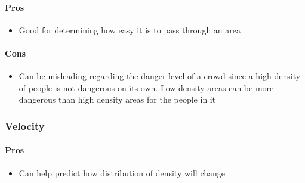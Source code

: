 \paragraph{Pros}
\begin{itemize}
    \item Good for determining how easy it is to pass through an area
\end{itemize}

\paragraph{Cons}
\begin{itemize}
    \item Can be misleading regarding the danger level of a crowd since a high density of people is not dangerous on its own. Low density areas can be more dangerous than high density areas for the people in it
\end{itemize}

\subsubsection{Velocity}


\paragraph{Pros}
\begin{itemize}
    \item Can help predict how distribution of density will change
\end{itemize}


